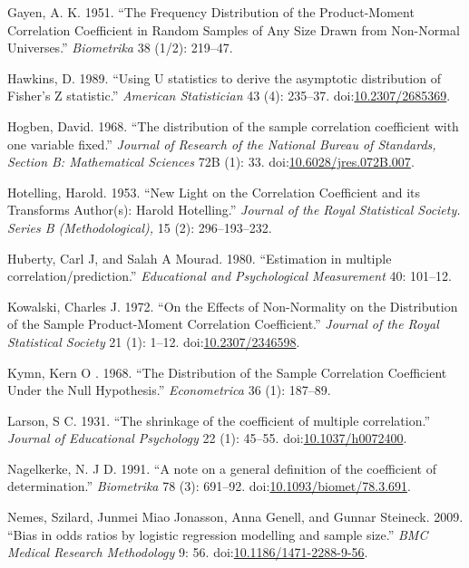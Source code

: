 \documentclass[]{article}
\begin{document}
\hypertarget{ref-Gayen1951}{}
Gayen, A. K. 1951. ``The Frequency Distribution of the Product-Moment
Correlation Coefficient in Random Samples of Any Size Drawn from
Non-Normal Universes.'' \emph{Biometrika} 38 (1/2): 219--47.

\hypertarget{ref-Hawkins1989}{}
Hawkins, D. 1989. ``Using U statistics to derive the asymptotic
distribution of Fisher's Z statistic.'' \emph{American Statistician} 43
(4): 235--37.
doi:\href{https://doi.org/10.2307/2685369}{10.2307/2685369}.

\hypertarget{ref-Hogben1968}{}
Hogben, David. 1968. ``The distribution of the sample correlation
coefficient with one variable fixed.'' \emph{Journal of Research of the
National Bureau of Standards, Section B: Mathematical Sciences} 72B (1):
33.
doi:\href{https://doi.org/10.6028/jres.072B.007}{10.6028/jres.072B.007}.

\hypertarget{ref-Hotelling1953}{}
Hotelling, Harold. 1953. ``New Light on the Correlation Coefficient and
its Transforms Author(s): Harold Hotelling.'' \emph{Journal of the Royal
Statistical Society. Series B (Methodological),} 15 (2): 296--193--232.

\hypertarget{ref-Huberty1980}{}
Huberty, Carl J, and Salah A Mourad. 1980. ``Estimation in multiple
correlation/prediction.'' \emph{Educational and Psychological
Measurement} 40: 101--12.

\hypertarget{ref-Kowalski1972}{}
Kowalski, Charles J. 1972. ``On the Effects of Non-Normality on the
Distribution of the Sample Product-Moment Correlation Coefficient.''
\emph{Journal of the Royal Statistical Society} 21 (1): 1--12.
doi:\href{https://doi.org/10.2307/2346598}{10.2307/2346598}.

\hypertarget{ref-Kymn1968}{}
Kymn, Kern O . 1968. ``The Distribution of the Sample Correlation
Coefficient Under the Null Hypothesis.'' \emph{Econometrica} 36 (1):
187--89.

\hypertarget{ref-Larson1931}{}
Larson, S C. 1931. ``The shrinkage of the coefficient of multiple
correlation.'' \emph{Journal of Educational Psychology} 22 (1): 45--55.
doi:\href{https://doi.org/10.1037/h0072400}{10.1037/h0072400}.

\hypertarget{ref-Nagelkerke1991}{}
Nagelkerke, N. J D. 1991. ``A note on a general definition of the
coefficient of determination.'' \emph{Biometrika} 78 (3): 691--92.
doi:\href{https://doi.org/10.1093/biomet/78.3.691}{10.1093/biomet/78.3.691}.

\hypertarget{ref-Nemes2009}{}
Nemes, Szilard, Junmei Miao Jonasson, Anna Genell, and Gunnar Steineck.
2009. ``Bias in odds ratios by logistic regression modelling and sample
size.'' \emph{BMC Medical Research Methodology} 9: 56.
doi:\href{https://doi.org/10.1186/1471-2288-9-56}{10.1186/1471-2288-9-56}.
\end{document}

